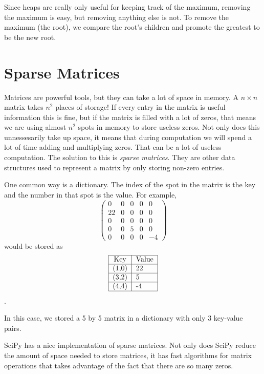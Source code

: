 Since heaps are really only useful for keeping track of the maximum, removing the maximum is easy, but removing anything else is not.
To remove the maximum (the root), we compare the root's children and promote the greatest to be the new root.


\section*{Sparse Matrices}
Matrices are powerful tools, but they can take a lot of space in memory.
A $n \times n$ matrix takes $n^2$ places of storage!
If every entry in the matrix is useful information this is fine, but if the matrix is filled with a lot of zeros, that means we are using almost $n^2$ spots in memory to store useless zeros.
Not only does this unnessesarily take up space, it means that during computation we will spend a lot of time adding and multiplying zeros.
That can be a lot of useless computation. 
The solution to this is \emph{sparse matrices}.
They are other data structures used to represent a matrix by only storing non-zero entries.

One common way is a dictionary.
The index of the spot in the matrix is the key and the number in that spot is the value.
For example, 
\[
\begin{pmatrix}
0 & 0 & 0 & 0 & 0 \\
22 & 0 & 0 & 0 & 0 \\
0 & 0 & 0 & 0 & 0 \\
0 & 0 & 5 & 0 & 0 \\
0 & 0 & 0 & 0 & -4
\end{pmatrix}
\]
would be stored as 
\[
\begin{tabular}{|c|l|}
\hline
Key & Value \\
\hline
(1,0) & 22 \\
\hline
(3,2) & 5 \\
\hline
(4,4) & -4 \\
\hline
\end{tabular}
\].
 
In this case, we stored a 5 by 5 matrix in a dictionary with only 3 key-value pairs.
 
SciPy has a nice implementation of sparse matrices.
Not only does SciPy reduce the amount of space needed to store matrices, it has fast algorithms for matrix operations that takes advantage of the fact that there are so many zeros.
 
